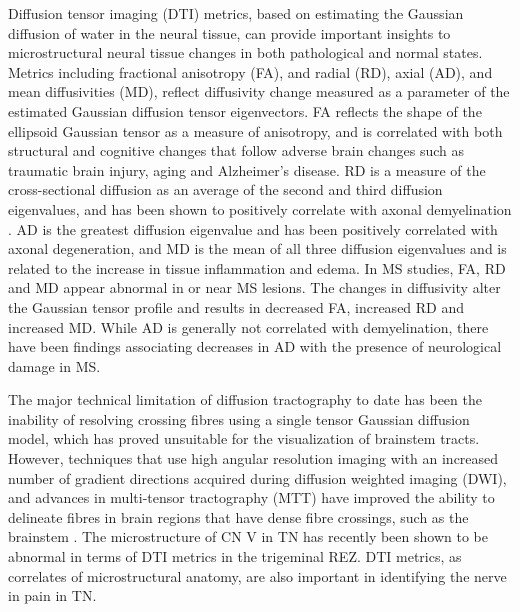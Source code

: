 Diffusion tensor imaging (DTI) metrics, based on estimating the Gaussian diffusion of water in the neural tissue, can provide important insights to microstructural neural tissue changes in both pathological and normal states. Metrics including fractional anisotropy (FA), and radial (RD), axial (AD), and mean diffusivities (MD), reflect diffusivity change measured as a parameter of the estimated Gaussian diffusion tensor eigenvectors.  FA reflects the shape of the ellipsoid Gaussian tensor as a measure of anisotropy, and is correlated with both structural and cognitive changes that follow adverse brain changes such as traumatic brain injury, aging and Alzheimer’s disease\cite{Bendlin2008,Charlton2006,Kinnunen2011c,Mielke2012}. RD is a measure of the cross-sectional diffusion as an average of the second and third diffusion eigenvalues, and has been shown to positively correlate with axonal demyelination \cite{Song2002,Song2005}. AD is the greatest diffusion eigenvalue and has been positively correlated with axonal degeneration\cite{Budde2009,Song2002}, and MD is the mean of all three diffusion eigenvalues and is related to the increase in tissue inflammation and edema\cite{Beaulieu2002}. In MS studies, FA, RD and MD appear abnormal in or near MS lesions. The changes in diffusivity alter the Gaussian tensor profile and results in decreased FA, increased RD and increased MD\cite{Braley2012,Janve2013,Klawiter2011,Lin2007,Senda2012g}. While AD is generally not correlated with demyelination\cite{Song2002}, there have been findings associating decreases in AD with the presence of neurological damage in MS\cite{Budde2008,Kim2006}. 

The major technical limitation of diffusion tractography to date has been the inability of resolving crossing fibres using a single tensor Gaussian diffusion model\cite{Farquharson2013}, which has proved unsuitable for the visualization of brainstem tracts. However, techniques that use high angular resolution imaging  with an increased number of gradient directions acquired during diffusion weighted imaging (DWI), and advances in multi-tensor tractography (MTT) have improved the ability to delineate fibres in brain regions that have dense fibre crossings, such as the brainstem \cite{DellAcqua2007,Descoteaux2009c,Fillard2011,Qazi2009}. The microstructure of CN V in TN has recently been shown to be abnormal in terms of DTI metrics in the trigeminal REZ\cite{Desouza2013}. DTI metrics, as correlates of microstructural anatomy, are also important in identifying the nerve in pain in TN\cite{Hodaie2009a}. 

